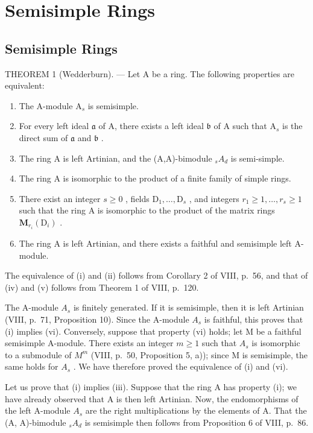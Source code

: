 \section{Semisimple Rings}

\subsection{Semisimple Rings}

THEOREM 1 (Wedderburn). --- Let A be a ring. The following properties are equivalent:

\begin{enumerate}
\def\labelenumi{(\roman{enumi})}
\item
  The A-module \(\mathrm{A}_s\) is semisimple.
\item
  For every left ideal \(\mathfrak{a}\) of A, there exists a left ideal \(\mathfrak{b}\) of A such that \(\mathrm{A}_s\) is the direct sum of \(\mathfrak{a}\) and \(\mathfrak{b}\) .
\item
  The ring A is left Artinian, and the (A,A)-bimodule \(_{s}A_{d}\) is semi-simple.
\item
  The ring A is isomorphic to the product of a finite family of simple rings.
\item
  There exist an integer \(s \geqslant 0\) , fields \(\mathrm{D}_1, \ldots, \mathrm{D}_s\) , and integers \(r_1 \geqslant 1, \ldots, r_s \geqslant 1\) such that the ring A is isomorphic to the product of the matrix rings \(\mathbf{M}_{r_i}(\mathrm{D}_i)\) .
\item
  The ring A is left Artinian, and there exists a faithful and semisimple left A-module.
\end{enumerate}

The equivalence of (i) and (ii) follows from Corollary 2 of VIII, p.~56, and that of (iv) and (v) follows from Theorem 1 of VIII, p.~120.

The A-module \(A_{s}\) is finitely generated. If it is semisimple, then it is left Artinian (VIII, p.~71, Proposition 10). Since the A-module \(A_{s}\) is faithful, this proves that (i) implies (vi). Conversely, suppose that property (vi) holds; let M be a faithful semisimple A-module. There exists an integer \(m \geqslant 1\) such that \(A_{s}\) is isomorphic to a submodule of \(M^{m}\) (VIII, p.~50, Proposition 5, a)); since M is semisimple, the same holds for \(A_{s}\) . We have therefore proved the equivalence of (i) and (vi).

Let us prove that (i) implies (iii). Suppose that the ring A has property (i); we have already observed that A is then left Artinian. Now, the endomorphisms of the left A-module \(A_{s}\) are the right multiplications by the elements of A. That the (A, A)-bimodule \(_{s}A_{d}\) is semisimple then follows from Proposition 6 of VIII, p.~86.


